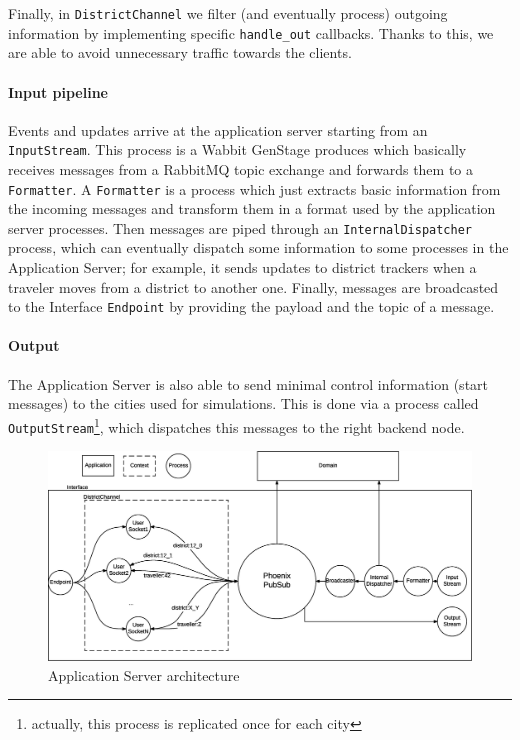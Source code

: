 Finally, in \texttt{DistrictChannel} we filter (and eventually process)
outgoing information by implementing specific \texttt{handle\_out} callbacks.
Thanks to this, we are able to avoid unnecessary traffic towards the clients.

\paragraph{Input pipeline}
Events and updates arrive at the application server starting from an
\texttt{InputStream}. This process is a Wabbit GenStage produces which
basically receives messages from a RabbitMQ topic exchange and forwards them
to a \texttt{Formatter}.
A \texttt{Formatter} is a process which just extracts basic information from
the incoming messages and transform them in a format used by the application
server processes.
Then messages are piped through an \texttt{InternalDispatcher} process, which
can eventually dispatch some information to some processes in the Application
Server; for example, it sends updates to district trackers when a traveler
moves from a district to another one.
Finally, messages are broadcasted to the Interface \texttt{Endpoint} by
providing the payload and the topic of a message.

\paragraph{Output}
The Application Server is also able to send minimal control information (start
messages) to the cities used for simulations. This is done via a process called
\texttt{OutputStream}\footnote{actually, this process is replicated once for
each city}, which dispatches this messages to the right backend node.

\begin{figure}[H]
  \centering
  \includegraphics[width=1.1\columnwidth]{images/implementation/as-chan-pubsub.eps}
  \caption{Application Server architecture}
  \label{fig:impl-as-pubsub}
\end{figure}
